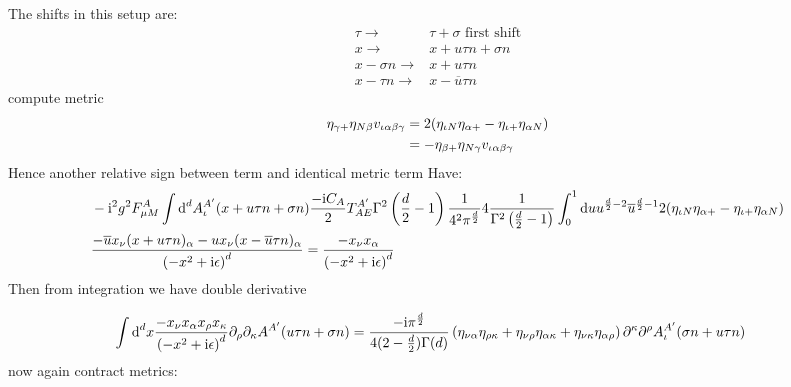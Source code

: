 The shifts in this setup are:
\begin{align}
	\tau \rightarrow &\tau + \sigma \text{   first shift}
	\\
	x \rightarrow & x + u\tau n + \sigma n
	\\
	x-\sigma n \rightarrow & x + u \tau n
	\\
	x-\tau n \rightarrow & x  - \overline u \tau n 
\end{align}
compute metric
\begin{align}
	\eta_{\gamma +}\eta_{N \beta}v_{\iota \alpha \beta\gamma} 
	&=
	2(\eta_{\iota N}\eta_{\alpha +} - \eta_{\iota+ }\eta_{\alpha N})
	\\
	&=
	-\eta_{\beta +}\eta_{N \gamma}v_{\iota \alpha \beta\gamma} 
\end{align}
Hence another relative sign between term and identical metric term
Have:
\begin{align}
	&-\text{i}^2 g^2 F_{\mu M}^{A} \int \text{d} ^d  A_\iota^{A'}(x+ u \tau n+ \sigma n)\frac{-\text{i} C_A}{2} T^{A'}_{AE}\Gamma^2\left(\frac{d}{2}-1\right)\frac{1}{4^2\pi^\frac{d}{2}}4 \frac{1}{\Gamma^2\left(\frac{d}{2}-1\right)}\int_0^1 \text{d} u u^{\frac{d}{2}-2}\overline u^{\frac{d}{2}-1}2(\eta_{\iota N}\eta_{\alpha +} - \eta_{\iota+ }\eta_{\alpha N})
	\\
	&\frac{-\overline u x_\nu(x+ u \tau  n)_\alpha- u x_\nu(x - \overline u \tau n )_\alpha }{\left(-x^2+\text{i} \epsilon\right)^{d}} =\frac{-x_\nu x_\alpha}{\left(-x^2+\text{i} \epsilon\right)^{d}}
\end{align}
Then from integration we have double derivative

\begin{align}
	\int \text{d} ^d x \frac{-x_\nu x_\alpha x_\rho x_\kappa}{\left(-x^2+\text{i} \epsilon\right)^{d}} \partial_\rho \partial_\kappa A^{A'}(u\tau n + \sigma n)
	&=
	\frac{-\text{i} \pi^{\frac{d}{2}}}{4(2-\frac{d}{2})\Gamma(d)}\left(  \eta_{\nu \alpha} \eta_{\rho \kappa}+ \eta_{\nu \rho} \eta_{\alpha\kappa} + \eta_{\nu \kappa} \eta_{\alpha \rho} \right) \partial^\kappa\partial^\rho A_\iota^{A'} (\sigma n+ u\tau n)
\end{align}
now again contract metrics: 

